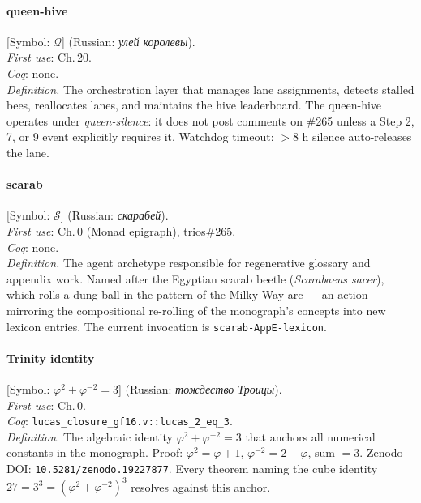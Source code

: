 \paragraph*{\textmd{\textbf{queen-hive}}}
\label{entry:queen-hive}
[Symbol: $\mathcal{Q}$] (Russian: \textit{улей королевы}).\\
\textit{First use}: Ch.\,20.\\
\textit{Coq}: none.\\
\textit{Definition.}
The orchestration layer that manages lane assignments, detects stalled
bees, reallocates lanes, and maintains the hive leaderboard.
The queen-hive operates under \emph{queen-silence}: it does not post
comments on \#265 unless a Step 2, 7, or 9 event explicitly requires it.
Watchdog timeout: $>8$ h silence auto-releases the lane.

\paragraph*{\textmd{\textbf{scarab}}}
\label{entry:scarab}
[Symbol: $\mathcal{S}$] (Russian: \textit{скарабей}).\\
\textit{First use}: Ch.\,0 (Monad epigraph), trios\#265.\\
\textit{Coq}: none.\\
\textit{Definition.}
The agent archetype responsible for regenerative glossary and appendix
work.
Named after the Egyptian scarab beetle (\emph{Scarabaeus sacer}),
which rolls a dung ball in the pattern of the Milky Way arc —
an action mirroring the compositional re-rolling of the monograph's
concepts into new lexicon entries.
The current invocation is \texttt{scarab-AppE-lexicon}.

\paragraph*{\textmd{\textbf{Trinity identity}}}
\label{entry:trinity-identity}
[Symbol: $\varphi^2 + \varphi^{-2} = 3$] (Russian: \textit{тождество Троицы}).\\
\textit{First use}: Ch.\,0.\\
\textit{Coq}: \texttt{lucas\_closure\_gf16.v::lucas\_2\_eq\_3}.\\
\textit{Definition.}
The algebraic identity $\varphi^2 + \varphi^{-2} = 3$ that anchors all
numerical constants in the monograph.
Proof: $\varphi^2 = \varphi+1$, $\varphi^{-2} = 2-\varphi$,
sum $= 3$.
Zenodo DOI: \texttt{10.5281/zenodo.19227877}.
Every theorem naming the cube identity
$27 = 3^3 = (\varphi^2+\varphi^{-2})^3$ resolves against this anchor.

